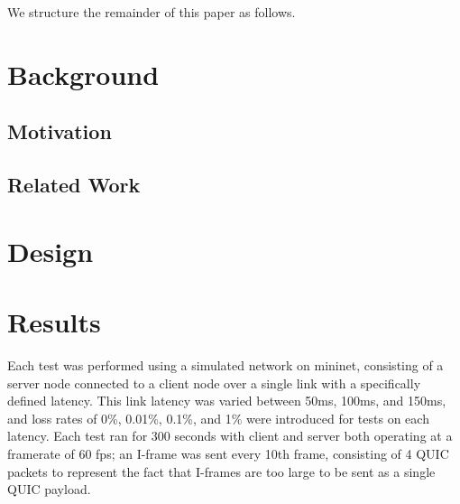 \documentclass{mpaper}
\begin{document}
We structure the remainder of this paper as follows.

%
%
\section{Background}


\subsection{Motivation}

\subsection{Related Work}


\section{Design}




\section{Results}

Each test was performed using a simulated network on mininet, consisting of a server node connected to a client node over a single link with a specifically defined latency. This link latency was varied between 50ms, 100ms, and 150ms, and loss rates of 0\%, 0.01\%, 0.1\%, and 1\% were introduced for tests on each latency. Each test ran for 300 seconds with client and server both operating at a framerate of 60 fps; an I-frame was sent every 10th frame, consisting of 4 QUIC packets to represent the fact that I-frames are too large to be sent as a single QUIC payload.
\end{document}
